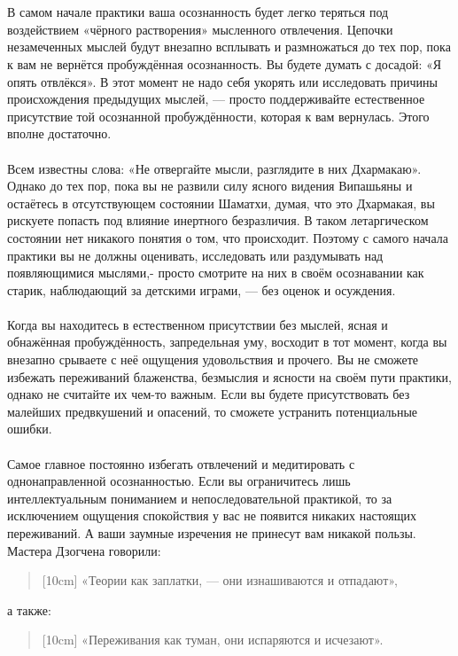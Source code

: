 \\ \\ В самом начале практики ваша осознанность будет легко теряться под воздействием «чёрного растворения» мысленного отвлечения. Цепочки незамеченных мыслей будут внезапно всплывать и размножаться до тех пор, пока к вам не вернётся пробуждённая осознанность. Вы будете думать с досадой: «Я опять отвлёкся». В этот момент не надо себя укорять или исследовать причины происхождения предыдущих мыслей, — просто поддерживайте естественное присутствие той осознанной пробуждённости, которая к вам вернулась. Этого вполне достаточно.
\\ \\ Всем известны слова: «Не отвергайте мысли, разглядите в них Дхармакаю». Однако до тех пор, пока вы не развили силу ясного видения Випашьяны и остаётесь в отсутствующем состоянии Шаматхи, думая, что это Дхармакая, вы рискуете попасть под влияние инертного безразличия. В таком летаргическом состоянии нет никакого понятия о том, что происходит. Поэтому с самого начала практики вы не должны оценивать, исследовать или раздумывать над появляющимися мыслями,- просто смотрите на них в своём осознавании как старик, наблюдающий за детскими играми, — без оценок и осуждения.
\\ \\ Когда вы находитесь в естественном присутствии без мыслей, ясная и обнажённая пробуждённость, запредельная уму, восходит в тот момент, когда вы внезапно срываете с неё ощущения удовольствия и прочего. Вы не сможете избежать переживаний блаженства, безмыслия и ясности на своём пути практики, однако не считайте их чем-то важным. Если вы будете присутствовать без малейших предвкушений и опасений, то сможете устранить потенциальные ошибки.
\\ \\ Самое главное постоянно избегать отвлечений и медитировать с однонаправленной осознанностью. Если вы ограничитесь лишь интеллектуальным пониманием и непоследовательной практикой, то за исключением ощущения спокойствия у вас не появится никаких настоящих переживаний. А ваши заумные изречения не принесут вам никакой пользы. Мастера Дзогчена говорили:
\begin{verse}[10cm]
«Теории как заплатки, — они изнашиваются и отпадают»,
\end{verse}
а также: 
\begin{verse}[10cm]
«Переживания как туман, они испаряются и исчезают».
\end{verse}

